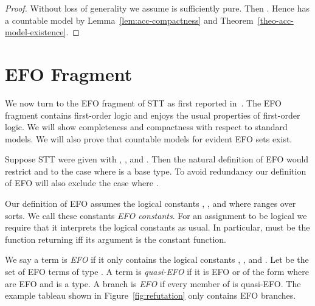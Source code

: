 \begin{proof}
  Without loss of generality we assume  is
  sufficiently pure.  Then .  Hence 
  has a countable model by
  Lemma~\ref{lem:acc-compactness} and
  Theorem~\ref{theo-acc-model-existence}.
\end{proof}

\section{EFO Fragment}



We now turn to the EFO fragment of STT as first reported in~\cite{BrownSmolkaEFO}.
The EFO fragment contains first-order logic
and enjoys the usual properties of first-order logic.
We will show completeness and compactness with respect to standard models.
We will also prove that countable models for evident EFO sets exist.

Suppose STT were given with , ,  and .
Then the natural definition of EFO would restrict
 and  to the case where  is a base type.
To avoid redundancy our definition of EFO will also exclude the case where .

Our definition of EFO assumes the logical constants , ,
 and  where
 ranges over sorts.  We call these constants \emph{EFO constants}.
For an assignment to be logical we require that it interprets the logical
constants as usual.  In particular,  must be
the function returning  iff its argument is the constant  function.

We say a term is \emph{EFO} if it only contains the logical constants , ,  and .
Let \emph{} be the set of EFO terms of type .
A term is \emph{quasi-EFO} if it is EFO or of the form  where  are EFO
and  is a type. A branch  is \emph{EFO} if every member of  is quasi-EFO.
The example tableau shown in Figure~\ref{fig:refutation} only contains EFO branches.

